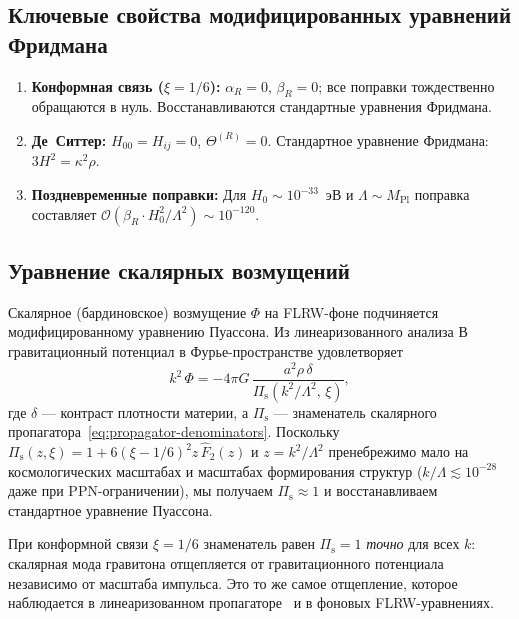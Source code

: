 \documentclass[12pt,a4paper]{article}
\newcommand{\Pis}{\Pi_{\mathrm{s}}}
\newcommand{\order}{\mathcal{O}}
\newcommand{\Lam}{\Lambda}
\theoremstyle{plain}
\theoremstyle{definition}
\begin{document}
\subsection{Ключевые свойства модифицированных уравнений Фридмана}

\begin{enumerate}[nosep]
  \item \textbf{Конформная связь ($\xi = 1/6$):}
    $\alpha_R = 0$, $\beta_R = 0$; все поправки тождественно обращаются
    в нуль.  Восстанавливаются стандартные уравнения Фридмана.

  \item \textbf{Де~Ситтер:}  $H_{00} = H_{ij} = 0$,
    $\Theta^{(R)} = 0$.  Стандартное уравнение Фридмана:
    $3H^2 = \kappa^2\rho$.

  \item \textbf{Поздневременные поправки:}  Для $H_0 \sim 10^{-33}$~эВ и
    $\Lam \sim M_{\mathrm{Pl}}$ поправка составляет
    $\order(\beta_R \cdot H_0^2/\Lam^2) \sim 10^{-120}$.
\end{enumerate}

\subsection{Уравнение скалярных возмущений}

Скалярное (бардиновское) возмущение $\Phi$ на FLRW-фоне подчиняется
модифицированному уравнению Пуассона.  Из линеаризованного анализа
В~\cite{Alfyorov:2026ss} гравитационный потенциал в Фурье-пространстве удовлетворяет
\begin{equation}\label{eq:poisson-mod-flrw}
  k^2\,\Phi = -4\pi G\,\frac{a^2\rho\,\delta}
  {\Pis(k^2/\Lam^2,\,\xi)},
\end{equation}
где $\delta$ --- контраст плотности материи, а $\Pis$ --- знаменатель
скалярного пропагатора~\eqref{eq:propagator-denominators}.  Поскольку
$\Pis(z,\xi) = 1 + 6(\xi - 1/6)^2 z\,\hat{F}_2(z)$ и
$z = k^2/\Lam^2$ пренебрежимо мало на космологических масштабах и
масштабах формирования структур ($k/\Lam \lesssim 10^{-28}$ даже при
PPN-ограничении), мы получаем $\Pis \approx 1$ и восстанавливаем
стандартное уравнение Пуассона.

При конформной связи $\xi = 1/6$ знаменатель равен $\Pis = 1$
\emph{точно} для всех $k$: скалярная мода гравитона отщепляется от
гравитационного потенциала независимо от масштаба импульса.  Это то же
самое отщепление, которое наблюдается в линеаризованном
пропагаторе~\cite{Alfyorov:2026ff} и в фоновых FLRW-уравнениях.
\end{document}
